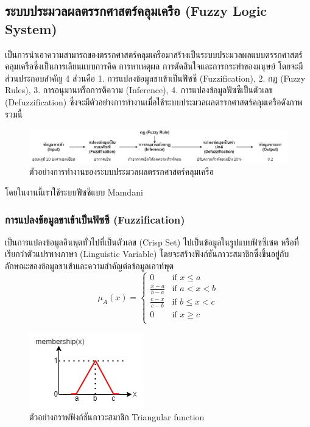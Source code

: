\subsection{ระบบประมวลผลตรรกศาสตร์คลุมเครือ (Fuzzy Logic System)}
เป็นการนำเอาความสามารถของตรรกศาสตร์คลุมเครือมาสร้างเป็นระบบประมวลผลแบบตรรกศาสตร์คลุมเครือซึ่งเป็นการเลียนแบบการคิด การหาเหตุผล การตัดสินใจและการกระทำของมนุษย์ โดยจะมีส่วนประกอบสำคัญ 4 ส่วนคือ 1. การแปลงข้อมูลขาเข้าเป็นฟัซซี (Fuzzification), 2. กฏ (Fuzzy Rules), 3. การอนุมานหรือการตีความ (Inference), 4. การแปลงข้อมูลฟัซซีเป็นตัวเลข (Defuzzification)
ซึ่งจะมีตัวอย่างการทำงานเมื่อใช้ระบบประมวลผลตรรกศาสตร์คลุมเครือดังภาพรวมนี้
\begin{figure}[ht]
    \centering
    \includegraphics[scale=0.375]{images/ex_fis.png}
    \caption{ตัวอย่างการทำงานของระบบประมวลผลตรรกศาสตร์คลุมเครือ}
    \label{fig:5}
\end{figure}

โดยในงานนี้เราใช้ระบบฟัซซีแบบ Mamdani

\subsubsection{การแปลงข้อมูลขาเข้าเป็นฟัซซี (Fuzzification)}
เป็นการแปลงข้อมูลอินพุตทั่วไปที่เป็นตัวเลข (Crisp Set) ไปเป็นข้อมูลในรูปแบบฟัซซีเซต หรือที่เรียกว่าตัวแปรทางภาษา (Linguistic Variable) โดยจะสร้างฟังก์ชันภาวะสมาชิกซึ่งขึ้นอยู่กับลักษณะของข้อมูลขาเข้าและความสำคัญต่อข้อมูลเอาท์พุต
\begin{equation} \mu_A(x) = \begin{cases}
0 & \text{if } x \leq a \\
\frac{x-a}{b-a} & \text{if } a < x < b \\
\frac{c-x}{c-b} & \text{if } b \leq x < c \\
0 & \text{if } x \geq c \\
\end{cases} \end{equation}
\begin{figure}[ht]
    \centering
    \includegraphics[scale=0.7]{images/ex_memship.png}
    \caption{ตัวอย่างกราฟฟังก์ชันภาวะสมาชิก Triangular function}
    \label{fig:6}
\end{figure}

